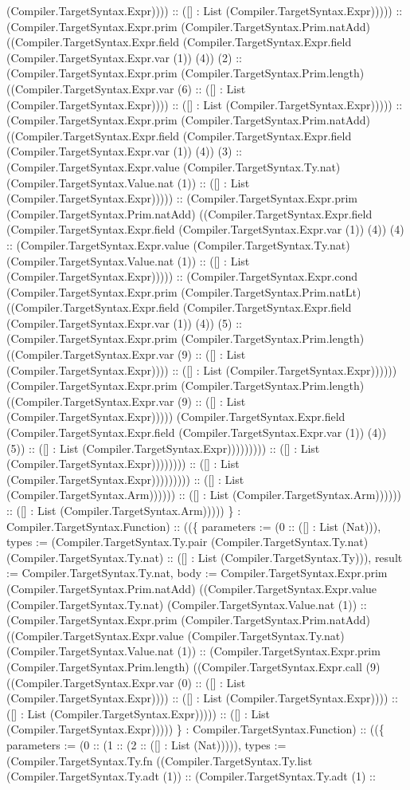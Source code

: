 \documentclass[11pt]{article}
\begin{document}
(Compiler.TargetSyntax.Expr)))) :: ([] : List (Compiler.TargetSyntax.Expr))))) :: (Compiler.TargetSyntax.Expr.prim (Compiler.TargetSyntax.Prim.natAdd) ((Compiler.TargetSyntax.Expr.field (Compiler.TargetSyntax.Expr.field (Compiler.TargetSyntax.Expr.var (1)) (4)) (2) :: (Compiler.TargetSyntax.Expr.prim (Compiler.TargetSyntax.Prim.length) ((Compiler.TargetSyntax.Expr.var (6) :: ([] : List (Compiler.TargetSyntax.Expr)))) :: ([] : List (Compiler.TargetSyntax.Expr))))) :: (Compiler.TargetSyntax.Expr.prim (Compiler.TargetSyntax.Prim.natAdd) ((Compiler.TargetSyntax.Expr.field (Compiler.TargetSyntax.Expr.field (Compiler.TargetSyntax.Expr.var (1)) (4)) (3) :: (Compiler.TargetSyntax.Expr.value (Compiler.TargetSyntax.Ty.nat) (Compiler.TargetSyntax.Value.nat (1)) :: ([] : List (Compiler.TargetSyntax.Expr))))) :: (Compiler.TargetSyntax.Expr.prim (Compiler.TargetSyntax.Prim.natAdd) ((Compiler.TargetSyntax.Expr.field (Compiler.TargetSyntax.Expr.field (Compiler.TargetSyntax.Expr.var (1)) (4)) (4) :: (Compiler.TargetSyntax.Expr.value (Compiler.TargetSyntax.Ty.nat) (Compiler.TargetSyntax.Value.nat (1)) :: ([] : List (Compiler.TargetSyntax.Expr))))) :: (Compiler.TargetSyntax.Expr.cond (Compiler.TargetSyntax.Expr.prim (Compiler.TargetSyntax.Prim.natLt) ((Compiler.TargetSyntax.Expr.field (Compiler.TargetSyntax.Expr.field (Compiler.TargetSyntax.Expr.var (1)) (4)) (5) :: (Compiler.TargetSyntax.Expr.prim (Compiler.TargetSyntax.Prim.length) ((Compiler.TargetSyntax.Expr.var (9) :: ([] : List (Compiler.TargetSyntax.Expr)))) :: ([] : List (Compiler.TargetSyntax.Expr)))))) (Compiler.TargetSyntax.Expr.prim (Compiler.TargetSyntax.Prim.length) ((Compiler.TargetSyntax.Expr.var (9) :: ([] : List (Compiler.TargetSyntax.Expr))))) (Compiler.TargetSyntax.Expr.field (Compiler.TargetSyntax.Expr.field (Compiler.TargetSyntax.Expr.var (1)) (4)) (5)) :: ([] : List (Compiler.TargetSyntax.Expr))))))))) :: ([] : List (Compiler.TargetSyntax.Expr)))))))) :: ([] : List (Compiler.TargetSyntax.Expr))))))))) :: ([] : List (Compiler.TargetSyntax.Arm)))))) :: ([] : List (Compiler.TargetSyntax.Arm)))))) :: ([] : List (Compiler.TargetSyntax.Arm))))) \} : Compiler.TargetSyntax.Function) :: ((\{ parameters := (0 :: ([] : List (Nat))), types := (Compiler.TargetSyntax.Ty.pair (Compiler.TargetSyntax.Ty.nat) (Compiler.TargetSyntax.Ty.nat) :: ([] : List (Compiler.TargetSyntax.Ty))), result := Compiler.TargetSyntax.Ty.nat, body := Compiler.TargetSyntax.Expr.prim (Compiler.TargetSyntax.Prim.natAdd) ((Compiler.TargetSyntax.Expr.value (Compiler.TargetSyntax.Ty.nat) (Compiler.TargetSyntax.Value.nat (1)) :: (Compiler.TargetSyntax.Expr.prim (Compiler.TargetSyntax.Prim.natAdd) ((Compiler.TargetSyntax.Expr.value (Compiler.TargetSyntax.Ty.nat) (Compiler.TargetSyntax.Value.nat (1)) :: (Compiler.TargetSyntax.Expr.prim (Compiler.TargetSyntax.Prim.length) ((Compiler.TargetSyntax.Expr.call (9) ((Compiler.TargetSyntax.Expr.var (0) :: ([] : List (Compiler.TargetSyntax.Expr)))) :: ([] : List (Compiler.TargetSyntax.Expr)))) :: ([] : List (Compiler.TargetSyntax.Expr))))) :: ([] : List (Compiler.TargetSyntax.Expr))))) \} : Compiler.TargetSyntax.Function) :: ((\{ parameters := (0 :: (1 :: (2 :: ([] : List (Nat))))), types := (Compiler.TargetSyntax.Ty.fn ((Compiler.TargetSyntax.Ty.list (Compiler.TargetSyntax.Ty.adt (1)) :: (Compiler.TargetSyntax.Ty.adt (1) :: 
\end{document}
